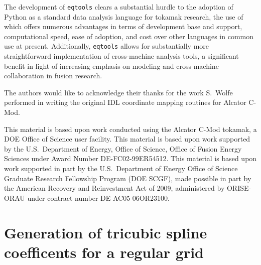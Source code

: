 \documentclass[12pt,floatfix,showpacs]{revtex4-1}
\newcommand{\eqtools}{\texttt{eqtools}\xspace}
\begin{document}
The development of \eqtools clears a substantial hurdle to the adoption of Python as a standard data analysis language for tokamak research, the use of which offers numerous advantages in terms of development base and support, computational speed, ease of adoption, and cost over other languages in common use at present.
Additionally, \eqtools allows for substantially more straightforward implementation of cross-machine analysis tools, a significant benefit in light of increasing emphasis on modeling and cross-machine collaboration in fusion research.


\begin{acknowledgements}
The authors would like to acknowledge their thanks for the work S.~Wolfe performed in writing the original IDL coordinate mapping routines for Alcator C-Mod.

This material is based upon work conducted using the Alcator C-Mod tokamak, a DOE Office of Science user facility.
This material is based upon work supported by the U.S.\ Department of Energy, Office of Science, Office of Fusion Energy Sciences under Award Number DE-FC02-99ER54512.
This material is based upon work supported in part by the U.S.\ Department of Energy Office of Science Graduate Research Fellowship Program (DOE SCGF), made possible in part by the American Recovery and Reinvestment Act of 2009, administered by ORISE-ORAU under contract number DE-AC05-06OR23100.

\end{acknowledgements}

\appendix
\section{Generation of tricubic spline coefficents for a regular grid}\label{sec:App}
\end{document}
